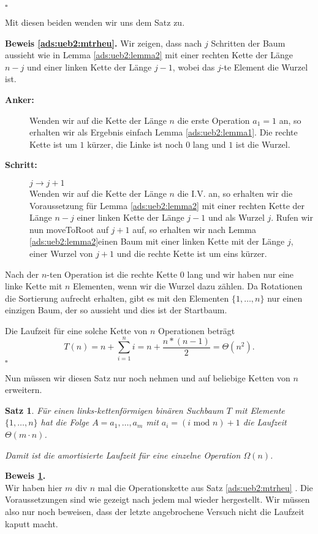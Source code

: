 \documentclass[11pt,a4paper,ngerman]{article}
\newtheorem{propo}{Satz}
\begin{document}
\mbox{}\hfill$\square$

Mit diesen beiden wenden wir uns dem Satz zu.

\noindent\textbf{Beweis \ref{ads:ueb2:mtrheu}.}
Wir zeigen, dass nach $j$ Schritten der Baum aussieht wie in Lemma \ref{ads:ueb2:lemma2} mit einer rechten Kette der Länge $n-j$ und einer linken Kette
der Länge $j-1$, wobei das $j$-te Element die Wurzel ist.
\begin{description}
   \item[\bfseries Anker:] Wenden wir auf die Kette der Länge $n$ die erste Operation $a_1 = 1$ an, so erhalten wir als Ergebnis einfach
         Lemma \ref{ads:ueb2:lemma1}. Die rechte Kette ist um $1$ kürzer, die Linke ist noch $0$ lang und $1$ ist die Wurzel.
   \item[\bfseries Schritt:] $j \rightarrow j+1$\\
         Wenden wir auf die Kette der Länge $n$ die I.V. an, so erhalten wir die Voraussetzung für Lemma \ref{ads:ueb2:lemma2}
         mit einer rechten Kette der Länge $n-j$ einer linken Kette der Länge $j-1$ und als Wurzel $j$. Rufen wir nun moveToRoot auf $j+1$ auf,
         so erhalten wir nach Lemma  \ref{ads:ueb2:lemma2}einen Baum mit einer linken Kette mit der Länge $j$, einer Wurzel von $j+1$ und die rechte Kette ist um eins kürzer.
\end{description}
Nach der $n$-ten Operation ist die rechte Kette $0$ lang und wir haben nur eine linke Kette mit $n$ Elementen, wenn wir die Wurzel dazu zählen. Da Rotationen
die Sortierung aufrecht erhalten, gibt es mit den Elementen $\{1, \ldots , n\}$ nur einen einzigen Baum, der so aussieht und dies ist der Startbaum.

Die Laufzeit für eine solche Kette von $n$ Operationen beträgt
$$
   T(n) = n + \sum_{i=1}^n i = n + \frac{n*(n-1)}{2} = \Theta(n^2).
$$
\mbox{}\hfill$\square$

Nun müssen wir diesen Satz nur noch nehmen und auf beliebige Ketten von $n$ erweitern.

\begin{propo} \label{ads:ueb2:mtrheuend}
   Für einen links-kettenförmigen binären Suchbaum $T$ mit Elemente $\{1, \ldots, n\}$ hat die Folge
   $A = a_1, \ldots, a_m$ mit $a_i = (i \text{ mod } n) + 1$ die Laufzeit $\Theta(m \cdot n)$.

   Damit ist die amortisierte Laufzeit für eine einzelne Operation $\Omega(n)$.
\end{propo}

\noindent\textbf{Beweis \ref{ads:ueb2:mtrheuend}.}\\
   Wir haben hier $m \text{ div } n$ mal die Operationskette aus Satz \ref{ads:ueb2:mtrheu} . Die Voraussetzungen sind wie gezeigt nach jedem mal wieder hergestellt.
   Wir müssen also nur noch beweisen, dass der letzte angebrochene Versuch nicht die Laufzeit kaputt macht.
\end{document}
